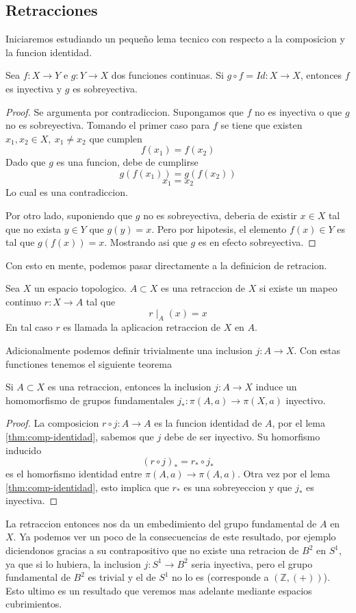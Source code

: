 \subsection{Retracciones}
Iniciaremos estudiando un pequeño lema tecnico con respecto a la
composicion y la funcion identidad.
\begin{lema} \label{thm:comp-identidad}
  Sea \(f : X \to Y\) e \(g : Y \to X\) dos funciones continuas. Si \( g
  \circ f = Id : X \to X \), entonces \(f\) es inyectiva y \(g\) es
  sobreyectiva.
\end{lema}
\begin{proof}
  Se argumenta por contradiccion. Supongamos que \(f\) no es inyectiva o
  que \(g\) no es sobreyectiva. Tomando el primer caso para \(f\) se
  tiene que existen \(x_1 , x_2 \in X,\ x_1 \neq x_2\) que cumplen
  \[ f (x_1) = f(x_2) \]
  Dado que \(g\) es una funcion, debe de cumplirse
  \[ g (f (x_1)) = g (f(x_2)) \]
  \[ x_1 = x_2 \]
  Lo cual es una contradiccion.

  Por otro lado, suponiendo que \(g\) no es sobreyectiva, deberia de
  existir \(x \in X\) tal que no exista \( y \in Y\) que \(g (y) = x\).
  Pero por hipotesis, el elemento \(f(x) \in Y\) es tal que \(g (f (x))
  = x\). Mostrando asi que \(g\) es en efecto sobreyectiva.
\end{proof}
Con esto en mente, podemos pasar directamente a la definicion de retracion.
\begin{definicion}
  Sea \(X\) un espacio topologico. \(A \subset X\) es una retraccion de
  \(X\) si existe un mapeo continuo \(r : X \to A\) tal que
  \[ r \mid_{A} (x) = x \]
  En tal caso \(r\) es llamada la aplicacion retraccion de \(X\) en \(A\).
\end{definicion}
Adicionalmente podemos definir trivialmente una inclusion \(j : A \to
X\). Con estas functiones tenemos el siguiente teorema
\begin{teorema}
Si \(A \subset X\) es una retraccion, entonces la inclusion \(j : A \to
X\) induce un homomorfismo de grupos fundamentales \(j_{*} : \pi(A, a)
\to \pi(X,a)\) inyectivo.
\end{teorema}
\begin{proof}
  La composicion \(r \circ j : A \to A\) es la funcion identidad de
  \(A\), por el lema \ref{thm:comp-identidad}, sabemos que \(j\) debe de
  ser inyectivo. Su homorfismo inducido
  \[ (r \circ j)_{*} = r_{*} \circ j_{*} \]
  es el homorfismo identidad entre \(\pi(A,a) \to \pi(A,a)\). Otra vez
  por el lema \ref{thm:comp-identidad}, esto implica que \(r_{*}\) es una
  sobreyeccion y que \(j_{*}\) es inyectiva.
\end{proof}
La retraccion entonces nos da un embedimiento del grupo fundamental de
\( A \) en \(X\). Ya podemos ver un poco de la consecuencias de este
resultado, por ejemplo diciendonos gracias a su contrapositivo que no
existe una retracion de \(B^2\) en \(S^1\), ya que si lo hubiera, la
inclusion \(j : S^1 \to B^2\) seria inyectiva, pero el grupo fundamental
de \(B^2\) es trivial y el de \(S^1\) no lo es (corresponde a \((\mathbb
Z, (+))\)). Esto ultimo es un resultado que veremos mas adelante mediante
espacios cubrimientos.

